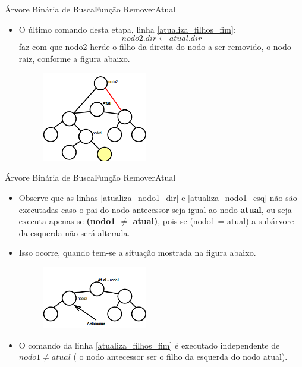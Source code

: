 \documentclass[aspectratio=169]{beamer}
\begin{document}
\begin{frame}{Árvore Binária de Busca}{Função RemoverAtual}
\begin{itemize}
\item O último comando desta etapa, linha \ref{atualiza_filhos_fim}:
\[
  nodo2.dir \leftarrow atual.dir
\]
faz com que nodo2 herde o filho da \underline{direita} do nodo a ser removido, o nodo raiz, conforme a figura abaixo.
\begin{figure}[!h]
  \centering
  \includegraphics[width=130pt]{imagens/remover_atual4.png}
  \label{fig_remover_atual4}
\end{figure}
\end{itemize}
\end{frame}


\begin{frame}{Árvore Binária de Busca}{Função RemoverAtual}
\begin{itemize}
\item Observe que as linhas \ref{atualiza_nodo1_dir} e \ref{atualiza_nodo1_esq} não são executadas caso o pai do nodo antecessor seja igual ao nodo {\bf atual}, ou seja executa apenas se {\bf (nodo1 $\neq$ atual)}, pois se (nodo1 = atual) a subárvore da esquerda não será alterada.
\item Isso ocorre, quando tem-se a situação mostrada na figura abaixo.
\begin{figure}[!h]
  \centering
  \includegraphics[width=130pt]{imagens/remover_atual5.png}
  \label{fig_remover_atual5}
\end{figure}
\item O comando da linha  \ref{atualiza_filhos_fim} é executado independente de $nodo1 \neq atual$ ( o nodo antecessor ser o filho da esquerda do nodo atual).
\end{itemize}
\end{frame}
\end{document}
